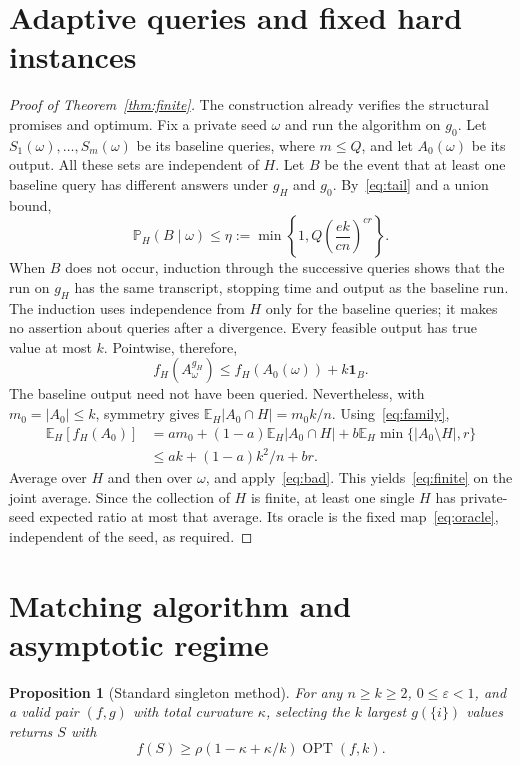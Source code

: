 \documentclass[manuscript,11pt,screen,nonacm]{acmart}
\newcommand{\E}{\mathbb E}
\newcommand{\OPT}{\operatorname{OPT}}
\newcommand{\eps}{\varepsilon}
\newtheorem{proposition}[theorem]{Proposition}
\newcommand{\Prb}{\mathbb P}
\begin{document}
\section{Adaptive queries and fixed hard instances}

\begin{proof}[Proof of Theorem~\ref{thm:finite}]
The construction already verifies the structural promises and optimum.
Fix a private seed $\omega$ and run the algorithm on $g_0$.
Let $S_1(\omega),\ldots,S_m(\omega)$ be its baseline queries, where
$m\le Q$, and let $A_0(\omega)$ be its output. All these sets are
independent of $H$. Let $B$ be the event that at least one baseline
query has different answers under $g_H$ and $g_0$.
By~\eqref{eq:tail} and a union bound,
\begin{equation}\label{eq:bad}
 \Prb_H(B\mid\omega)\le
 \eta:=\min\left\{1,Q\left(\frac{e k}{cn}\right)^{cr}\right\}.
\end{equation}
When $B$ does not occur, induction through the successive queries shows
that the run on $g_H$ has the same transcript, stopping time and output
as the baseline run. The induction uses independence from $H$ only for
the baseline queries; it makes no assertion about queries after a divergence.
Every feasible output has true value at most $k$. Pointwise, therefore,
\[
 f_H(A^{g_H}_\omega)\le f_H(A_0(\omega))+k\mathbf 1_B.
\]
The baseline output need not have been queried. Nevertheless, with
$m_0=|A_0|\le k$, symmetry gives $\E_H|A_0\cap H|=m_0 k/n$.
Using~\eqref{eq:family},
\begin{align*}
 \E_H[f_H(A_0)]
 &=a m_0+(1-a)\E_H|A_0\cap H|
                  +b\E_H\min\{|A_0\setminus H|,r\}\\
 &\le ak+(1-a)k^2/n+br.
\end{align*}
Average over $H$ and then over $\omega$, and apply~\eqref{eq:bad}.
This yields~\eqref{eq:finite} on the joint average.
Since the collection of $H$ is finite, at least one single $H$ has
private-seed expected ratio at most that average. Its oracle is the fixed
map~\eqref{eq:oracle}, independent of the seed, as required.
\end{proof}

\section{Matching algorithm and asymptotic regime}

\begin{proposition}[Standard singleton method]\label{prop:singletons}
For any $n\ge k\ge2$, $0\le\eps<1$, and a valid pair $(f,g)$
with total curvature $\kappa$, selecting the $k$ largest $g(\{i\})$
values returns $S$ with
\begin{equation}\label{eq:singleton}
 f(S)\ge\rho(1-\kappa+\kappa/k)\OPT(f,k).
\end{equation}
\end{proposition}
\end{document}
